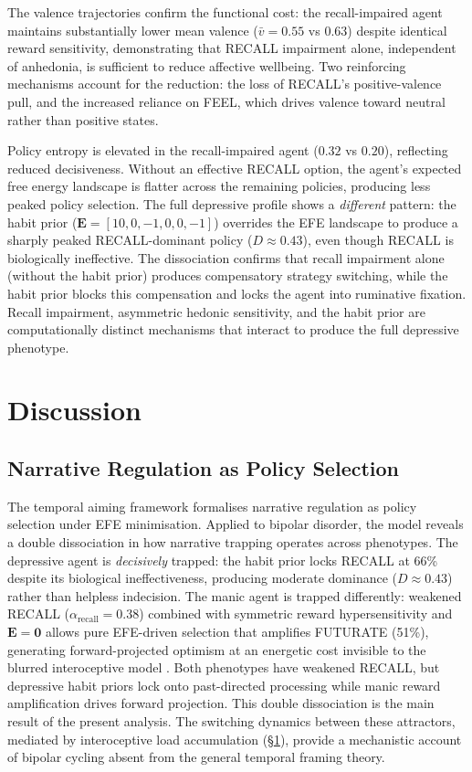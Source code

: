 \documentclass[11pt,a4paper]{article}
\begin{document}
The valence trajectories confirm the functional cost: the recall-impaired agent maintains substantially lower mean valence ($\bar{v} = 0.55$ vs $0.63$) despite identical reward sensitivity, demonstrating that RECALL impairment alone, independent of anhedonia, is sufficient to reduce affective wellbeing. Two reinforcing mechanisms account for the reduction: the loss of RECALL's positive-valence pull, and the increased reliance on FEEL, which drives valence toward neutral rather than positive states.

Policy entropy is elevated in the recall-impaired agent ($0.32$ vs $0.20$), reflecting reduced decisiveness. Without an effective RECALL option, the agent's expected free energy landscape is flatter across the remaining policies, producing less peaked policy selection. The full depressive profile shows a \emph{different} pattern: the habit prior ($\mathbf{E} = [10, 0, -1, 0, 0, -1]$) overrides the EFE landscape to produce a sharply peaked RECALL-dominant policy ($D \approx 0.43$), even though RECALL is biologically ineffective. The dissociation confirms that recall impairment alone (without the habit prior) produces compensatory strategy switching, while the habit prior blocks this compensation and locks the agent into ruminative fixation. Recall impairment, asymmetric hedonic sensitivity, and the habit prior are computationally distinct mechanisms that interact to produce the full depressive phenotype.



\section{Discussion}\label{sec:discussion}

\subsection{Narrative Regulation as Policy Selection}

The temporal aiming framework \citep{albarracin2026temporal} formalises narrative regulation as policy selection under EFE minimisation. Applied to bipolar disorder, the model reveals a double dissociation in how narrative trapping operates across phenotypes. The depressive agent is \emph{decisively} trapped: the habit prior locks RECALL at 66\% despite its biological ineffectiveness, producing moderate dominance ($D \approx 0.43$) rather than helpless indecision. The manic agent is trapped differently: weakened RECALL ($\alpha_{\text{recall}} = 0.38$) combined with symmetric reward hypersensitivity and $\mathbf{E} = \mathbf{0}$ allows pure EFE-driven selection that amplifies FUTURATE (51\%), generating forward-projected optimism at an energetic cost invisible to the blurred interoceptive model \citep{johnson2012behavioral, alloy2010role}. Both phenotypes have weakened RECALL, but depressive habit priors lock onto past-directed processing while manic reward amplification drives forward projection. This double dissociation is the main result of the present analysis. The switching dynamics between these attractors, mediated by interoceptive load accumulation (\S\ref{sec:discussion}), provide a mechanistic account of bipolar cycling absent from the general temporal framing theory.
\end{document}
